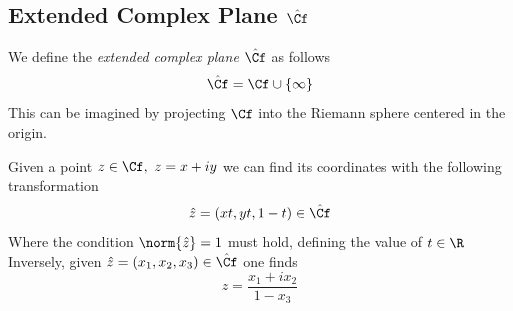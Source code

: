 \documentclass[../mmf.tex]{subfiles}
\begin{document}
\subsection{Extended Complex Plane $\hat{\Cf}$}
\begin{dfn}
	We define the \textit{extended complex plane} $\hat{\Cf}$ as follows
	\begin{equation}
		\hat{\Cf}=\Cf\cup\{\infty\}
		\label{eq:extendedcf}
	\end{equation}
	This can be imagined by projecting $\Cf$ into the Riemann sphere centered in the origin.
\end{dfn}
\begin{dfn}
	Given a point $z\in\Cf,\ z=x+iy$ we can find its coordinates with the following transformation
	\begin{equation}
		\hat{z}=(xt,yt,1-t)\in\hat{\Cf}
		\label{eq:pointinhatcf}
	\end{equation}
	Where the condition $\norm{\hat{z}}=1$ must hold, defining the value of $t\in\R$
	Inversely, given $\hat{z}=(x_1,x_2,x_3)\in\hat{\Cf}$ one finds
	\begin{equation}
		z=\frac{x_1+ix_2}{1-x_3}
		\label{eq:hatcftocf}
	\end{equation}
\end{dfn}
\end{document}
